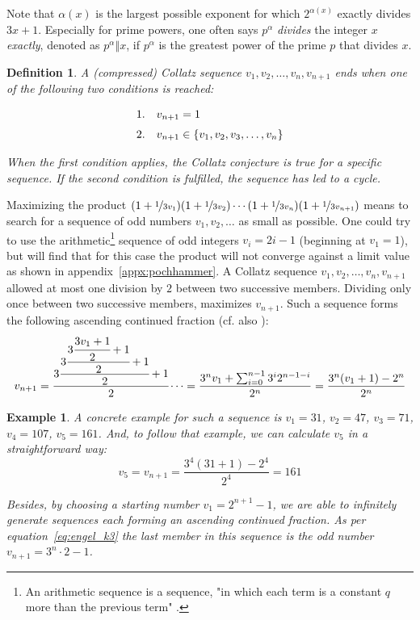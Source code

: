 \documentclass[12pt]{amsart}
\newtheorem{definition}[theorem]{Definition}
\newtheorem{example}[theorem]{Example}
\theoremstyle{definition}
\begin{document}
\par\medskip
Note that $\alpha(x)$ is the largest possible exponent for which $2^{\alpha(x)}$ exactly divides $3x+1$. Especially for prime powers, one often says $p^\alpha$ \textit{divides} the integer $x$ \textit{exactly}, denoted as $p^\alpha\mathrel\Vert x$, if $p^\alpha$ is the greatest power of the prime $p$ that divides $x$.

\newpage
\begin{definition}
\label{def:halting_conditions}
A (compressed) Collatz sequence $v_1,v_2,\ldots,v_n,v_{n+1}$ ends when one of the following two conditions is reached:

\[
\begin{array}{ll}
\text{1.}&v_{n+1}=1\\[\medskipamount]
\text{2.}&v_{n+1}\in\{v_1,v_2,v_3,\ldots,v_n\}
\end{array}
\]

When the first condition applies, the Collatz conjecture is true for a specific sequence. If the second condition is fulfilled, the sequence has led to a cycle.
\end{definition}

\par\bigskip\noindent
Maximizing the product $(1+\nicefrac{1}{3v_1})(1+\nicefrac{1}{3v_2})\cdots(1+\nicefrac{1}{3v_n})(1+\nicefrac{1}{3v_{n+1}})$ means to search for a sequence of odd numbers $v_1,v_2,\ldots$ as small as possible. One could try to use the arithmetic\footnote{An arithmetic sequence is a sequence, "in which each term is a constant $q$ more than the previous term" \cite[p.~206]{Ref_Brualdi_2010}.} sequence of odd integers $v_i=2i-1$ (beginning at $v_1=1$), but will find that for this case the product will not converge against a limit value as shown in appendix~\ref{appx:pochhammer}. A Collatz sequence $v_1,v_2,\ldots,v_n,v_{n+1}$ allowed at most one division by $2$ between two successive members. Dividing only once between two successive members, maximizes $v_{n+1}$. Such a sequence forms the following ascending continued fraction (cf. also \cite[p.~11]{Ref_Laarhoven}):
\begin{equation}
\label{eq:engel_k3}
v_{n+1}=\cfrac{3\cfrac{3\cfrac{3\cfrac{3v_1+1}{2}+1}{2}+1}{2}+1}{2}\dotsb
=\frac{3^nv_1+\sum_{i=0}^{n-1}3^i2^{n-1-i}}{2^n}
=\frac{3^n(v_1+1)-2^n}{2^n}
\end{equation}

\medskip
\begin{example}
\label{ex:engel_31}
A concrete example for such a sequence is $v_1=31$, $v_2=47$, $v_3=71$, $v_4=107$, $v_5=161$. And, to follow that example, we can calculate $v_5$ in a straightforward way:
\[
v_5=v_{n+1}=\frac{3^4(31+1)-2^4}{2^4}=161
\]

\par\medskip
Besides, by choosing a starting number $v_1=2^{n+1}-1$, we are able to infinitely generate sequences each forming an ascending continued fraction. As per equation~\ref{eq:engel_k3} the last member in this sequence is the odd number $v_{n+1}=3^n\cdot2-1$.
\end{example}
\end{document}
